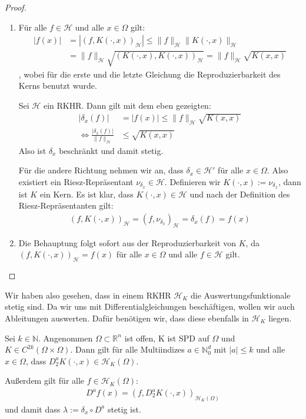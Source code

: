 \begin{proof}
\begin{enumerate}
\item Für alle $f \in \mathcal{H}$ und alle $x \in \Omega$ gilt:
\begin{align*}
|f(x)| &= |(f, K(\cdot,x))_\mathcal{H}| \le \|f\|_\mathcal{H}\|K(\cdot,x)\|_\mathcal{H}\\
&= \|f\|_\mathcal{H} \sqrt{(K(\cdot,x),K(\cdot,x))_\mathcal{H}} = \|f\|_\mathcal{H} \sqrt{K(x,x)}
\end{align*}
, wobei für die erste und die letzte Gleichung die Reproduzierbarkeit des Kerns benutzt wurde.

Sei $\mathcal{H}$ ein \ac{RKHR}. Dann gilt mit dem eben gezeigten:
\begin{align*}
|\delta_x(f)| &= |f(x)| \le \|f\|_\mathcal{H} \sqrt{K(x,x)}\\
\Leftrightarrow \frac{|\delta_x(f)|}{\|f\|_\mathcal{H}} &\le \sqrt{K(x,x)}
\end{align*}
Also ist $\delta_x$ beschränkt und damit stetig.

Für die andere Richtung nehmen wir an, dass $\delta_x  \in \mathcal{H}'$ für alle $x \in \Omega$. Also existiert ein Riesz-Repräsentant $\nu_{\delta_x} \in \mathcal{H}$. Definieren wir $K(\cdot,x):= \nu_{\delta_x}$, dann ist $K$ ein Kern. Es ist klar, dass $K(\cdot,x) \in \mathcal{H}$ und nach der Definition des Riesz-Repräsentanten gilt:
\begin{align*}
(f, K(\cdot,x))_\mathcal{H} = (f, \nu_{\delta_x})_\mathcal{H} = \delta_x(f) = f(x)
\end{align*}
\item Die Behauptung folgt sofort aus der Reproduzierbarkeit von $K$, da $(f, K(\cdot,x))_\mathcal{H}= f(x)$ für alle $x \in \Omega$ und alle $f \in \mathcal{H}$ gilt.
\end{enumerate}
\end{proof}



Wir haben also gesehen, dass in einem \ac{RKHR} $\mathcal{H}_K$ die Auswertungsfunktionale stetig sind. Da wir uns mit Differentialgleichungen beschäftigen, wollen wir auch Ableitungen auswerten. Dafür benötigen wir, dass diese ebenfalls in $\mathcal{H}_K$ liegen.

\begin{theorem}
Sei $k \in \mathbb{N}$. Angenommen $\Omega \subset \mathbb{R}^n$ ist offen, K ist \ac{SPD} auf $\Omega$ und $K \in C^{2k}(\Omega \times \Omega)$. Dann gilt für alle Multiindizes $a \in \mathbb{N}_0^d$ mit $|a| \le k$ und alle $x \in \Omega$, dass $D_2^a K(\cdot , x) \in \mathcal{H}_K(\Omega)$.

Außerdem gilt für alle $f \in \mathcal{H}_K(\Omega)$:
\begin{align*}
D^a f(x) = \left(f,D_2^a K(\cdot,x)\right)_{\mathcal{H}_K(\Omega)}
\end{align*}
und damit dass $\lambda := \delta_x \circ D^a$ stetig ist.
\end{theorem}

